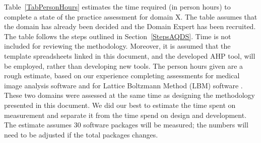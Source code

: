 \documentclass[letterpaper,cleveref]{lipics-v2019}
\begin{document}
Table~\ref{TabPersonHours} estimates the time required (in person hours) to
complete a state of the practice assessment for domain X.  The table assumes
that the domain has already been decided and the Domain Expert has been
recruited.  The table follows the steps outlined in Section~\ref{StepsAQDS}.
Time is not included for reviewing the methodology. Moreover, it is assumed that
the template spreadsheets linked in this document, and the developed AHP tool,
will be employed, rather than developing new tools.  The person hours given are
a rough estimate, based on our experience completing assessments for medical
image analysis software \citep{Dong2021} and for Lattice Boltzmann Method (LBM)
software \citep{Michalski2021}.  These two domains were assessed at the same
time as designing the methodology presented in this document.  We did our best
to estimate the time spent on measurement and separate it from the time spend on
design and development.  The estimate assumes 30 software packages will be
measured; the numbers will need to be adjusted if the total packages changes.
\end{document}
